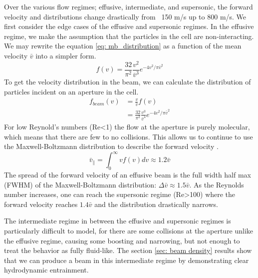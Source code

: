 Over the various flow regimes; effusive, intermediate, and supersonic, the forward velocity and distributions change drastically from ~150 m/s up to 800 m/s. We first consider the edge cases of the effusive and supersonic regimes. In the effusive regime, we make the assumption that the particles in the cell are non-interacting. We may rewrite the equation \ref{eq: mb_distribution} as a function of the mean velocity $\bar{v}$ into a simpler form.
\begin{equation}
	f(v) = \frac{32}{\pi^2} \frac{v^2}{\bar{v}^3} e^{-4v^2/\pi \bar{v}^2} \label{eq: mb_simplified}
\end{equation}
To get the velocity distribution in the beam, we can calculate the distribution of particles incident on an aperture in the cell.
\begin{align*}
	f_{beam}(v) & = \frac{v}{\bar{v}}f(v)  \\
	& = \frac{32}{\pi^2} \frac{v^3}{\bar{v}^4} e^{-4v^2/\pi \bar{v}^2}
\end{align*}
For low Reynold's numbers (Re<1) the flow at the aperture is purely molecular, which means that there are few to no collisions. This allows us to continue to use the Maxwell-Boltzmann distribution to describe the forward velocity \cite{Hutzler2011c}.
\begin{equation}
	\bar{v}_\parallel = \int_0^\infty v f(v) dv \approx 1.2 \bar{v}
\end{equation}
The spread of the forward velocity of an effusive beam is the full width half max (FWHM) of the Maxwell-Boltzmann distribution: $\Delta\bar{v} \approx 1.5 \bar{v}$. As the Reynolds number increases, one can reach the supersonic regime (Re>100) where the forward velocity reaches $1.4\bar{v}$ and the distribution drastically narrows.\cite{Hutzler2011c,Pauly}

The intermediate regime in between the effusive and supersonic regimes is particularly difficult to model, for there are some collisions at the aperture unlike the effusive regime, causing some boosting and narrowing, but not enough to treat the behavior as fully fluid-like. The section \ref{sec: beam density} results show that we can produce a beam in this intermediate regime by demonstrating clear hydrodynamic entrainment.

